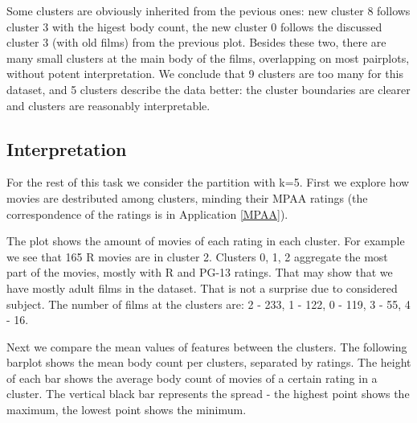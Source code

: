 \documentclass[a4paper,14pt]{article}
\begin{document}
 
    \begin{center}
\end{center}


Some clusters are obviously inherited from the pevious ones: new cluster 8 follows cluster 3 with the higest body count, the new cluster 0 follows the discussed cluster 3 (with old films) from the previous plot. Besides these two, there are many small clusters at the main body of the films, overlapping on most  pairplots, without potent interpretation. We conclude that 9 clusters are too many for this dataset, and 5 clusters describe the data better: the cluster boundaries are clearer and clusters are reasonably interpretable.

\subsection{Interpretation}

For the rest of this task we consider the partition with k=5. First we explore how movies are destributed among clusters, minding their MPAA ratings (the correspondence of the ratings is in Application \ref{MPAA}). 

    \large       
\begin{center}
\end{center}
\normalsize

The plot shows the amount of movies of each rating in each cluster. For example we see that 165 R movies are in cluster 2. Clusters 0, 1, 2 aggregate the most part of the movies, mostly with R and PG-13 ratings. That may show that we have mostly adult films in the dataset. That is not a surprise due to considered subject. The number of films at the clusters are: 
2 - 233,
1  -  122,
0  -  119,
3  -   55,
4  -   16.

Next we compare the mean values of features between the clusters. The following barplot shows the mean body count per clusters, separated by ratings. The height of each bar shows the average body count of movies of a certain rating in a cluster. The vertical black bar represents the spread - the highest point shows the maximum, the lowest point shows the minimum.


            
\begin{center}
\end{center}
 
\end{document}
